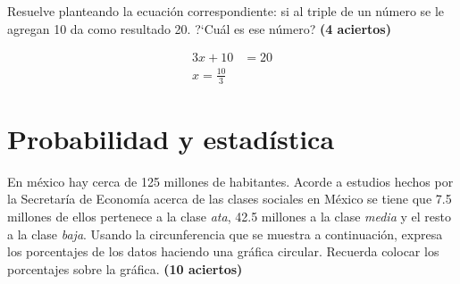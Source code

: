 \documentclass[11pt]{article}
\begin{document}
Resuelve planteando la ecuaci\'on correspondiente: si al triple de un n\'umero
se le agregan 10 da como resultado 20. ?`Cu\'al es ese n\'umero? \hfill
\textbf{(4 aciertos)}

\begin{align}
3x +10 &= 20  \nonumber \\
x= \frac{10}{3} \nonumber   
\end{align}

\vspace{0.5cm}

\section{Probabilidad y estad\'istica}
En m\'exico hay cerca de 125 millones de habitantes. Acorde a estudios hechos
por la Secretar\'ia de Econom\'ia acerca de las clases sociales en M\'exico se
tiene que 7.5 millones de ellos pertenece a la clase \emph{ata}, 42.5 millones a
la clase \emph{media} y el resto a la clase \emph{baja}. Usando la
circunferencia que se muestra a continuaci\'on, expresa los porcentajes de los
datos haciendo una gr\'afica circular. Recuerda colocar los porcentajes sobre la
gr\'afica. \hfill \textbf{(10 aciertos)}
\end{document}
